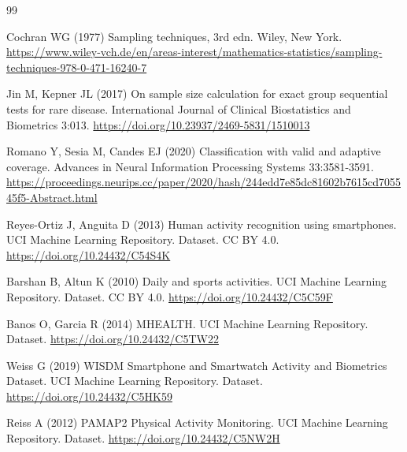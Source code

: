\documentclass[pdflatex,sn-basic,Numbered,iicol]{sn-jnl}
\begin{document}
\begin{thebibliography}{99}
\begin{minipage}[t]{\linewidth}Cochran WG (1977) Sampling techniques, 3rd edn. Wiley, New York. \url{https://www.wiley-vch.de/en/areas-interest/mathematics-statistics/sampling-techniques-978-0-471-16240-7}\end{minipage}

\begin{minipage}[t]{\linewidth}Jin M, Kepner JL (2017) On sample size calculation for exact group sequential tests for rare disease. International Journal of Clinical Biostatistics and Biometrics 3:013. \url{https://doi.org/10.23937/2469-5831/1510013}\end{minipage}

\begin{minipage}[t]{\linewidth}Romano Y, Sesia M, Candes EJ (2020) Classification with valid and adaptive coverage. Advances in Neural Information Processing Systems 33:3581-3591. \url{https://proceedings.neurips.cc/paper/2020/hash/244edd7e85dc81602b7615cd705545f5-Abstract.html}\end{minipage}

\begin{minipage}[t]{\linewidth}Reyes-Ortiz J, Anguita D (2013) Human activity recognition using smartphones. UCI Machine Learning Repository. Dataset. CC BY 4.0. \url{https://doi.org/10.24432/C54S4K}\end{minipage}

\begin{minipage}[t]{\linewidth}Barshan B, Altun K (2010) Daily and sports activities. UCI Machine Learning Repository. Dataset. CC BY 4.0. \url{https://doi.org/10.24432/C5C59F}\end{minipage}

\begin{minipage}[t]{\linewidth}Banos O, Garcia R (2014) MHEALTH. UCI Machine Learning Repository. Dataset. \url{https://doi.org/10.24432/C5TW22}\end{minipage}

\begin{minipage}[t]{\linewidth}Weiss G (2019) WISDM Smartphone and Smartwatch Activity and Biometrics Dataset. UCI Machine Learning Repository. Dataset. \url{https://doi.org/10.24432/C5HK59}\end{minipage}

\begin{minipage}[t]{\linewidth}Reiss A (2012) PAMAP2 Physical Activity Monitoring. UCI Machine Learning Repository. Dataset. \url{https://doi.org/10.24432/C5NW2H}\end{minipage}


\end{thebibliography}
\end{document}
